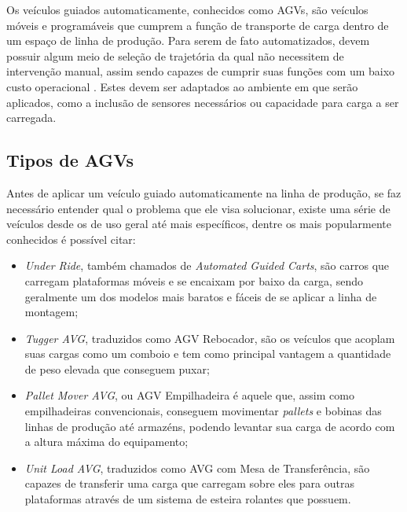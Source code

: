 Os veículos guiados automaticamente, conhecidos como AGVs, são veículos móveis
e programáveis que cumprem a função de transporte de carga dentro de um espaço
de linha de produção. Para serem de fato automatizados, devem possuir algum
meio de seleção de trajetória da qual não necessitem de intervenção manual,
assim sendo capazes de cumprir suas funções com um baixo custo operacional
\cite{kumar2016}. Estes devem ser adaptados ao ambiente em que serão
aplicados, como a inclusão de sensores necessários ou capacidade para carga a
ser carregada.

\subsection{Tipos de AGVs}

Antes de aplicar um veículo guiado automaticamente na linha de produção, se faz
necessário entender qual o problema que ele visa solucionar, existe uma série
de veículos desde os de uso geral até mais específicos, dentre os mais
popularmente conhecidos é possível citar:

\begin{itemize}
        \item \textit{Under Ride}, também chamados de \textit{Automated Guided Carts}, são carros
                que carregam plataformas móveis e se encaixam por baixo da
                carga, sendo geralmente um dos modelos mais baratos e fáceis de
                se aplicar a linha de montagem;

        \item \textit{Tugger AVG}, traduzidos como AGV Rebocador, são os veículos que
                acoplam suas cargas como um comboio e tem como principal
                vantagem a quantidade de peso elevada que conseguem puxar;

        \item \textit{Pallet Mover AVG}, ou AGV Empilhadeira é aquele que, assim como
                empilhadeiras convencionais, conseguem movimentar \textit{pallets} e
                bobinas das linhas de produção até armazéns, podendo levantar
                sua carga de acordo com a altura máxima do equipamento;

        \item \textit{Unit Load AVG}, traduzidos como AVG com Mesa de Transferência, são
                capazes de transferir uma carga que carregam sobre eles para
                outras plataformas através de um sistema de esteira rolantes
                que possuem.

\end{itemize}

